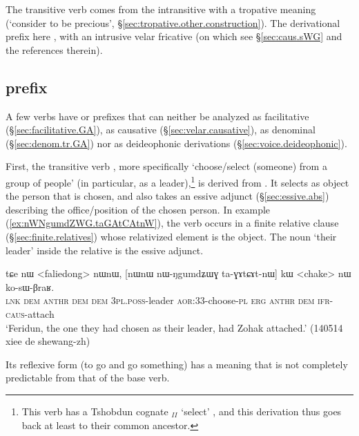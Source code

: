 The transitive verb  comes from the intransitive  with a tropative meaning (`consider to be precious', §\ref{sec:tropative.other.construction}). The derivational prefix here , with an intrusive velar fricative (on which see §\ref{sec:caus.sWG} and the references therein).


\subsection{ prefix  }  \label{sec:GA.non.denom}
A few verbs have  or  prefixes that can neither be analyzed as  facilitative  (§\ref{sec:facilitative.GA}),  as causative (§\ref{sec:velar.causative}), as denominal  (§\ref{sec:denom.tr.GA}) nor as deideophonic derivations (§\ref{sec:voice.deideophonic}). 

First, the transitive verb , more specifically `choose/select (someone) from a group of people' (in particular, as a leader),\footnote{This verb has a Tshobdun cognate $_{II}$  `select' \citep[209]{jackson19tshobdun}, and this derivation thus goes back at least to their common ancestor.
} is derived from . It selects as object the person that is chosen, and also takes an essive adjunct  (§\ref{sec:essive.abs}) describing the office/position of the chosen person. In example (\ref{ex:nWNgumdZWG.taGAtCAtnW}), the verb  occurs in a finite relative clause (§\ref{sec:finite.relatives}) whose relativized element is the object. The noun  `their leader' inside the relative is the essive adjunct.

\begin{exe}
\ex \label{ex:nWNgumdZWG.taGAtCAtnW}
\gll tɕe nɯ <faliedong> nɯnɯ, [nɯnɯ nɯ-ŋgumdʑɯɣ ta-ɣɤtɕɤt-nɯ] kɯ <chake> nɯ ko-sɯ-βraʁ. \\
\textsc{lnk} \textsc{dem}  \textsc{anthr} \textsc{dem} \textsc{dem} \textsc{3pl}.\textsc{poss}-leader \textsc{aor}:3\fl{}3-choose-\textsc{pl} \textsc{erg}  \textsc{anthr} \textsc{dem} \textsc{ifr}-\textsc{caus}-attach \\
\glt `Feridun, the one they had chosen as their leader, had Zohak attached.' (140514 xiee de shewang-zh)
\end{exe}

Its reflexive form  (to go and go something) has a meaning that is not completely predictable from that of the base verb.

